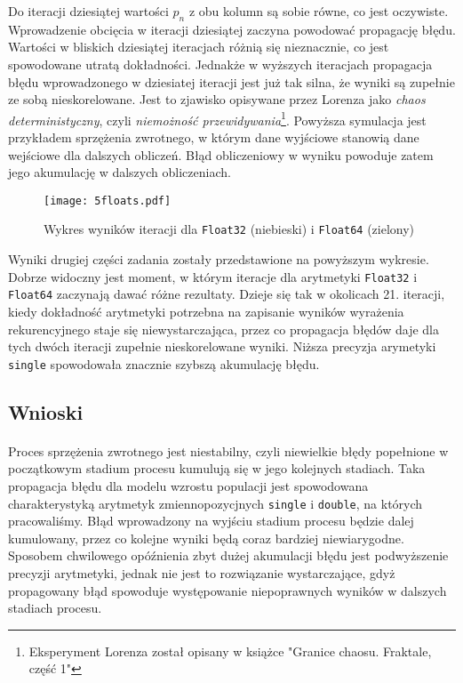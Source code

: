 \documentclass[a4paper]{article}
\begin{document}
Do iteracji dziesiątej wartości $p_{n}$ z obu kolumn są sobie równe, co jest oczywiste. Wprowadzenie obcięcia w iteracji dziesiątej zaczyna powodować propagację błędu. Wartości w bliskich dziesiątej iteracjach różnią się nieznacznie, co jest spowodowane utratą dokładności. Jednakże w wyższych iteracjach propagacja błędu wprowadzonego w dziesiatej iteracji jest już tak silna, że wyniki są zupełnie ze sobą nieskorelowane. Jest to zjawisko opisywane przez Lorenza jako \textit{chaos deterministyczny}, czyli \textit{niemożność przewidywania}\footnote{Eksperyment Lorenza został opisany w książce "Granice chaosu. Fraktale, część 1"}. Powyższa symulacja jest przykładem sprzężenia zwrotnego, w którym dane wyjściowe stanowią dane wejściowe dla dalszych obliczeń. Błąd obliczeniowy w wyniku powoduje zatem jego akumulację w dalszych obliczeniach.
\clearpage
\begin{figure}[htbp]
  \centering
  \texttt{[image: 5floats.pdf]}
  \caption{Wykres wyników iteracji dla \texttt{Float32} (niebieski) i \texttt{Float64} (zielony)}
\end{figure}

Wyniki drugiej części zadania zostały przedstawione na powyższym wykresie. Dobrze widoczny jest moment, w którym iteracje dla arytmetyki \texttt{Float32} i \texttt{Float64} zaczynają dawać różne rezultaty. Dzieje się tak w okolicach 21. iteracji, kiedy dokładność arytmetyki potrzebna na zapisanie wyników wyrażenia rekurencyjnego staje się niewystarczająca, przez co propagacja błędów daje dla tych dwóch iteracji zupełnie nieskorelowane wyniki. Niższa precyzja arymetyki \texttt{single} spowodowała znacznie szybszą akumulację błędu.
\subsection{Wnioski}
\paragraph{}
Proces sprzężenia zwrotnego jest niestabilny, czyli niewielkie błędy popełnione w początkowym stadium procesu kumulują się w jego kolejnych stadiach. Taka propagacja błędu dla modelu wzrostu populacji jest spowodowana charakterystyką arytmetyk zmiennopozycjnych \texttt{single} i \texttt{double}, na których pracowaliśmy. Błąd wprowadzony na wyjściu stadium procesu będzie dalej kumulowany, przez co kolejne wyniki będą coraz bardziej niewiarygodne. Sposobem chwilowego opóźnienia zbyt dużej akumulacji błędu jest podwyższenie precyzji arytmetyki, jednak nie jest to rozwiązanie wystarczające, gdyż propagowany błąd spowoduje występowanie niepoprawnych wyników w dalszych stadiach procesu.
\end{document}
